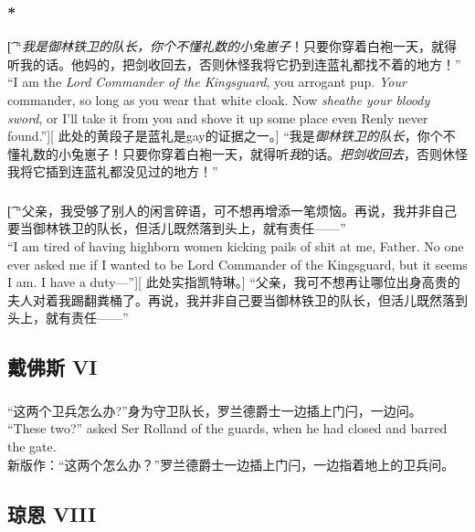 \documentclass[12pt,a4paper]{article}
\begin{document}
\subsubsection{\color{red}*}\t[
	“\emph{我是御林铁卫的队长，你个不懂礼数的小兔崽子}！只要你穿着白袍一天，就得听我的话。他妈的，把剑收回去，否则休怪我将它扔到连蓝礼都找不着的地方！”\\
	“I am the \emph{Lord Commander of the Kingsguard}, you arrogant pup. \emph{Your} commander, so long as you wear that white cloak. Now \emph{sheathe your bloody sword}, or I'll take it from you and shove it up some place even Renly never found.”][
	此处的黄段子是蓝礼是gay的证据之一。]
	“我是\emph{御林铁卫的队长}，你个不懂礼数的小兔崽子！只要你穿着白袍一天，就得听\emph{我}的话。\emph{把剑收回去}，否则休怪我将它插到连蓝礼都没见过的地方！”
	
\subsubsection{}\t[
	“父亲，我受够了别人的闲言碎语，可不想再增添一笔烦恼。再说，我并非自己要当御林铁卫的队长，但活儿既然落到头上，就有责任——”\\
	“I am tired of having highborn women kicking pails of shit at me, Father. No one ever asked me if I wanted to be Lord Commander of the Kingsguard, but it seems I am. I have a duty—”][
	此处实指凯特琳。]
	“父亲，我可不想再让哪位出身高贵的夫人对着我踢翻粪桶了。再说，我并非自己要当御林铁卫的队长，但活儿既然落到头上，就有责任——”
	
	
\subsection{戴佛斯 VI}
\subsubsection{}\color{blue}
	“这两个卫兵怎么办?”身为守卫队长，罗兰德爵士一边插上门闩，一边问。\\
	“These two?” asked Ser Rolland of the guards, when he had closed and barred the gate. \\\color{black}
	新版作：“这两个怎么办？”罗兰德爵士一边插上门闩，一边指着地上的卫兵问。
	
\subsection{琼恩 VIII}
\end{document}
